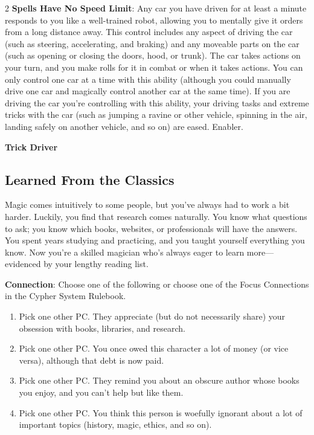 \begin{multicols}{2}
\textbf{Spells Have No Speed Limit}: Any car you have driven for at least a minute responds to you like a well-trained robot, allowing you to mentally give it orders from a long distance away. This control includes any aspect of driving the car (such as steering, accelerating, and braking) and any moveable parts on the car (such as opening or closing the doors, hood, or trunk). The car takes actions on your turn, and you make rolls for it in combat or when it takes actions. You can only control one car at a time with this ability (although you could manually drive one car and magically
control another car at the same time). If you are driving the car you’re controlling with this ability, your driving tasks and extreme tricks with the car (such as jumping a ravine or other vehicle, spinning in the air, landing safely on another vehicle, and so on) are eased. Enabler.

\textbf{Trick Driver}

\subsection{Learned From the Classics} 
 
Magic comes intuitively to some people, but you’ve always had to work a bit harder. Luckily, you find that research comes naturally. You know what questions to ask; you know which books, websites, or professionals will have the answers. You spent years studying and practicing, and you taught yourself everything you know. Now you’re a skilled magician who’s always eager to learn more—evidenced by your lengthy reading list.

\textbf{Connection}: Choose one of the following or choose one of the Focus Connections in the Cypher System Rulebook.
\begin{enumerate}
\item Pick one other PC. They appreciate (but do not necessarily share) your obsession with books, libraries, and research.
\item Pick one other PC. You once owed this character a lot of money (or vice versa), although that debt is now paid.
\item Pick one other PC. They remind you about an obscure author whose books you enjoy, and you can’t help but like them.
\item Pick one other PC. You think this person is woefully ignorant about a lot of important topics (history, magic, ethics, and so on).
\end{enumerate}


\end{multicols}
